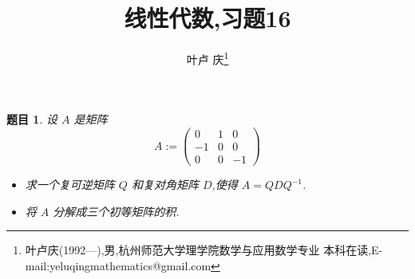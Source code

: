 \documentclass[a4paper]{article}
\newtheorem*{exe}{题目}
\newenvironment{exercise}
{\bigskip\begin{mdframed}\begin{exe}}
    {\end{exe}\end{mdframed}\bigskip}
\begin{document}
\title{\huge{\bf{线性代数,习题16}}} \author{\small{叶卢
    庆\footnote{叶卢庆(1992---),男,杭州师范大学理学院数学与应用数学专业
      本科在读,E-mail:yeluqingmathematics@gmail.com}}}
\maketitle
\begin{exercise}
  设 $A$ 是矩阵
$$
A:=
\begin{pmatrix}
  0&1&0\\
-1&0&0\\
0&0&-1
\end{pmatrix}
$$
\begin{itemize}
\item 求一个复可逆矩阵 $Q$ 和复对角矩阵 $D$,使得 $A=QDQ^{-1}$.
\item 将 $A$ 分解成三个初等矩阵的积.
\end{itemize}
\end{exercise}
\end{document}
